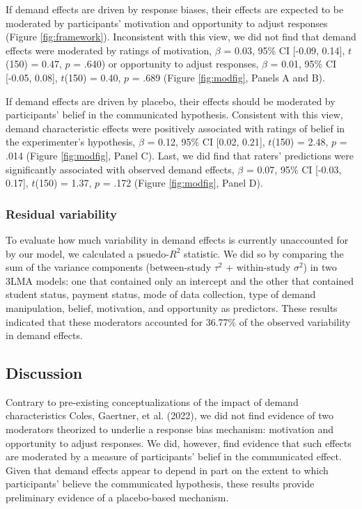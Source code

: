 \documentclass[
  man,floatsintext]{apa6}
\begin{document}
If demand effects are driven by response biases, their effects are expected to be moderated by participants' motivation and opportunity to adjust responses (Figure \ref{fig:framework}). Inconsistent with this view, we did not find that demand effects were moderated by ratings of motivation, \(\beta\) = 0.03, 95\% CI {[}-0.09, 0.14{]}, \(t\)(150) = 0.47, \(p\) = .640) or opportunity to adjust responses, \(\beta\) = 0.01, 95\% CI {[}-0.05, 0.08{]}, \(t\)(150) = 0.40, \(p\) = .689 (Figure \ref{fig:modfig}, Panels A and B).

If demand effects are driven by placebo, their effects should be moderated by participants' belief in the communicated hypothesis. Consistent with this view, demand characteristic effects were positively associated with ratings of belief in the experimenter's hypothesis, \(\beta\) = 0.12, 95\% CI {[}0.02, 0.21{]}, \(t\)(150) = 2.48, \(p\) = .014 (Figure \ref{fig:modfig}, Panel C). Last, we did find that raters' predictions were significantly associated with observed demand effects, \(\beta\) = 0.07, 95\% CI {[}-0.03, 0.17{]}, \(t\)(150) = 1.37, \(p\) = .172 (Figure \ref{fig:modfig}, Panel D).

\hypertarget{residual-variability}{%
\subsubsection{Residual variability}\label{residual-variability}}

To evaluate how much variability in demand effects is currently unaccounted for by our model, we calculated a psuedo-\(R^2\) statistic. We did so by comparing the sum of the variance components (between-study \(\tau^2\) + within-study \(\sigma^2\)) in two 3LMA models: one that contained only an intercept and the other that contained student status, payment status, mode of data collection, type of demand manipulation, belief, motivation, and opportunity as predictors. These results indicated that these moderators accounted for 36.77\% of the observed variability in demand effects.

\hypertarget{discussion-1}{%
\subsection{Discussion}\label{discussion-1}}

Contrary to pre-existing conceptualizations of the impact of demand characteristics Coles, Gaertner, et al. (2022), we did not find evidence of two moderators theorized to underlie a response bias mechanism: motivation and opportunity to adjust responses. We did, however, find evidence that such effects are moderated by a measure of participants' belief in the communicated effect. Given that demand effects appear to depend in part on the extent to which participants' believe the communicated hypothesis, these results provide preliminary evidence of a placebo-based mechanism.
\end{document}
